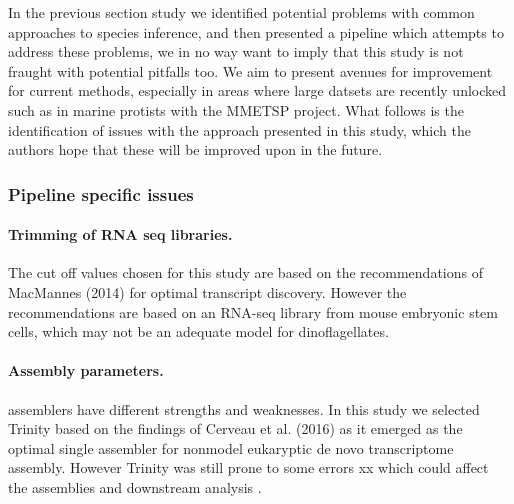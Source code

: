 \documentclass[12pt]{article}
\begin{document}
In the previous section study we identified potential problems with common approaches to species inference, and then presented a pipeline which attempts to address these problems, we in no way want to imply that this study is not fraught with potential pitfalls too. We aim to present avenues for improvement for current methods, especially in areas where large datsets are recently unlocked such as in marine protists with the MMETSP project. %
What follows is the identification of issues with the approach presented in this study, which the authors hope that these will be improved upon in the future. 
\subsubsection*{Pipeline specific issues}
\paragraph*{Trimming of RNA seq libraries.} The cut off values chosen for this study are based on the recommendations of MacMannes (2014) for optimal transcript discovery. However the recommendations are based on an RNA-seq library from mouse embryonic stem cells, which may not be an adequate model for dinoflagellates.
\paragraph*{Assembly parameters.} assemblers have different strengths and weaknesses. In this study we selected Trinity based on the findings of Cerveau et al. (2016) as it emerged as the optimal single assembler for nonmodel eukaryptic de novo transcriptome assembly. However Trinity was still prone to some errors xx which could affect the assemblies and downstream analysis \cite{cerveau2016combining}.
\end{document}
